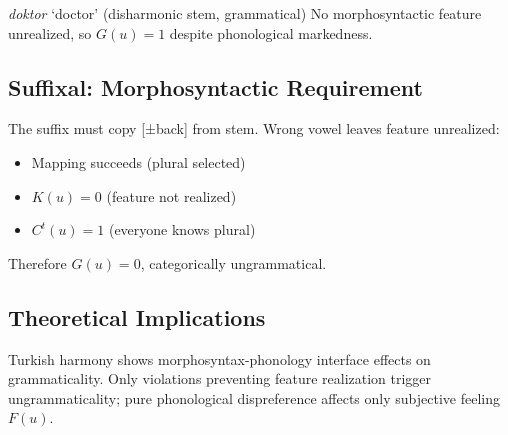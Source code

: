 \documentclass[12pt]{article}
\begin{document}
\ea
\textit{doktor} `doctor' (disharmonic stem, grammatical)
\z
No morphosyntactic feature unrealized, so $G(u) = 1$ despite phonological markedness.

\subsection{Suffixal: Morphosyntactic Requirement}

\ea
{}
\z
\z
The suffix must copy [±back] from stem. Wrong vowel leaves feature unrealized:
\begin{itemize}
\item Mapping succeeds (plural selected)
\item $K(u) = 0$ (feature not realized)
\item $C^t(u) = 1$ (everyone knows plural)
\end{itemize}

Therefore $G(u) = 0$, categorically ungrammatical.

\subsection{Theoretical Implications}

Turkish harmony shows morphosyntax-phonology interface effects on grammaticality. Only violations preventing feature realization trigger ungrammaticality; pure phonological dispreference affects only subjective feeling $F(u)$.

 \newpage
\begin{sloppypar}
\printbibliography[title=References]
\end{sloppypar}
\end{document}
